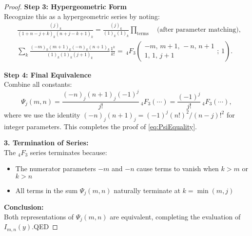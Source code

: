 \documentclass[12pt]{article}
\begin{document}
\begin{proof}
\textbf{Step 3: Hypergeometric Form}\\[1mm]
Recognize this as a hypergeometric series by noting:
\begin{align*}
& \frac{(j)_k}{(1 + n - j + k)_k (n + j - k + 1)_k} = \frac{(j)_k}{(1)_k (1)_k} \prod_{\text{terms}} \quad \text{(after parameter matching)}, \\
& \sum_{k} \frac{(-m)_k (m+1)_k (-n)_k (n+1)_k}{(1)_k (1)_k (j+1)_k} \frac{1^k}{k!} = {\,}_4F_3\left(
\begin{matrix}
-m,\, m+1,\, -n,\, n+1 \\
1,\, 1,\, j+1
\end{matrix};\, 1\right).
\end{align*}

\textbf{Step 4: Final Equivalence}\\[1mm]
Combine all constants:
\[
\Psi_j(m,n) = \frac{(-n)_j (n+1)_j (-1)^j}{j!} {\,}_4F_3\left( \cdots \right) = \frac{(-1)^j}{j!} {\,}_4F_3\left( \cdots \right),
\]
where we use the identity $(-n)_j (n+1)_j = (-1)^j (n!)^2 / (n - j)!^2$ for integer parameters. This completes the proof of \eqref{eq:PsiEquality}.

\textbf{3. Termination of Series:}\\[1mm]
The ${}_4F_3$ series terminates because:
\begin{itemize}
\item The numerator parameters $-m$ and $-n$ cause terms to vanish when $k > m$ or $k > n$
\item All terms in the sum $\Psi_j(m,n)$ naturally terminate at $k = \min(m,j)$
\end{itemize}

\textbf{Conclusion:}\\[1mm]
Both representations of $\Psi_j(m,n)$ are equivalent, completing the evaluation of $I_{m,n}(y)$.QED
\end{proof}
\end{document}
